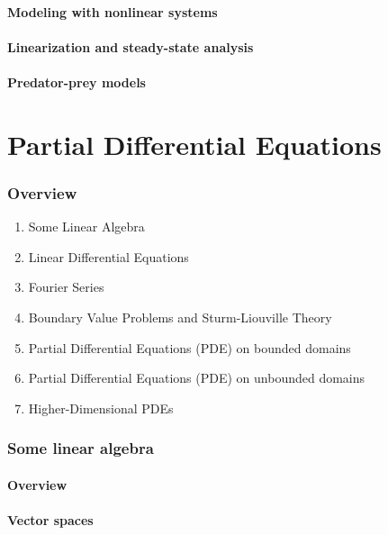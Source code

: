 \documentclass{article}
\begin{document}
\subsection{Modeling with nonlinear systems}
\subsection{Linearization and steady-state analysis}
\subsection{Predator-prey models}

\part{Partial Differential Equations} %
\label{prt:Partial Differential Equations}

\section{Overview}%
\label{sec:Overview}

\begin{enumerate}
    \item Some Linear Algebra
    \item Linear Differential Equations
    \item Fourier Series
    \item Boundary Value Problems and Sturm-Liouville Theory
    \item Partial Differential Equations (PDE) on bounded domains
    \item Partial Differential Equations (PDE) on unbounded domains
    \item Higher-Dimensional PDEs
\end{enumerate}

\pagebreak

\section{Some linear algebra}
\subsection*{Overview}
\subsection{Vector spaces}
\end{document}
